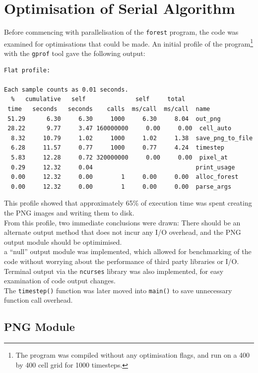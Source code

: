 \documentclass[11pt,a4paper]{report}
\begin{document}
\newpage

\section{Optimisation of Serial Algorithm}

Before commencing with parallelisation of the \texttt{forest} program, the code
was examined for optimisations that could be made. An initial profile of the
program\footnote{The program was compiled without any optimisation flags, and
run on a 400 by 400 cell grid for 1000 timesteps.} with the \texttt{gprof} tool gave the following output:

\begin{verbatim}
Flat profile:

Each sample counts as 0.01 seconds.
  %   cumulative   self              self     total
 time   seconds   seconds    calls  ms/call  ms/call  name
 51.29      6.30     6.30     1000     6.30     8.04  out_png
 28.22      9.77     3.47 160000000     0.00     0.00  cell_auto
  8.32     10.79     1.02     1000     1.02     1.38  save_png_to_file
  6.28     11.57     0.77     1000     0.77     4.24  timestep
  5.83     12.28     0.72 320000000     0.00     0.00  pixel_at
  0.29     12.32     0.04                             print_usage
  0.00     12.32     0.00        1     0.00     0.00  alloc_forest
  0.00     12.32     0.00        1     0.00     0.00  parse_args

\end{verbatim}

This profile showed that approximately 65\% of execution time was spent
creating the PNG images and writing them to disk.\\

From this profile, two immediate conclusions were drawn: There should be an
alternate output method that does not incur any I/O overhead, and the PNG
output module should be optimimised.\\

a ``null'' output module was implemented, which allowed for benchmarking of the
code without worrying about the performance of third party libraries or I/O.
Terminal output via the \texttt{ncurses} library was also implemented, for easy
examination of code output changes.\\

The \texttt{timestep()} function was later moved into \texttt{main()} to save
unnecessary function call overhead.
\newpage
\subsection{PNG Module}
\end{document}
